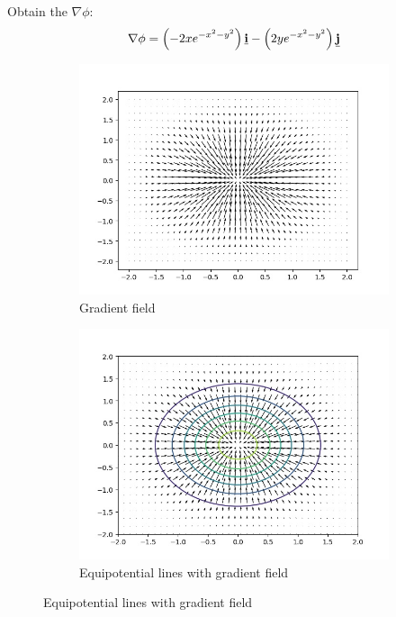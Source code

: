 \documentclass[10pt,a4paper]{article}
\begin{document}
Obtain the $\nabla\phi$:
$$
    \nabla \phi = \left(-2xe^{-x^2-y^2}\right)\textbf{\underline{i}}-\left(2ye^{-x^2-y^2}\right)\textbf{\underline{j}}
$$
\begin{figure} [h]
    \centering
    \begin{subfigure}{.5\textwidth}
      \centering
      \includegraphics[scale=0.35]{exp_quiver.jpeg}
      \caption{Gradient field}
      \label{fig:sub1}
    \end{subfigure}%
    \begin{subfigure}{.5\textwidth}
      \centering
      \includegraphics[scale=0.35]{exp_contour_quiver.jpeg}
      \caption{Equipotential lines with gradient field}
      \label{fig:sub2}
    \end{subfigure}
    \label{fig:test}
\end{figure}
\end{document}
